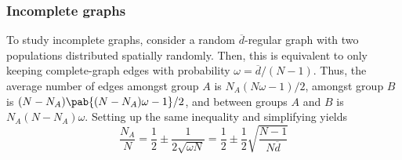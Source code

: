 \subsubsection{Incomplete graphs}\label{sec:two_unequal_groups_incomplete}
To study incomplete graphs,
consider a random $\overline{d}$-regular graph
with two populations distributed spatially randomly.
Then, this is equivalent to only keeping complete-graph edges
with probability $\omega = \overline{d}/(N-1)$.
Thus, the average number of edges
amongst group $A$ is $N_A (N \omega - 1)/2$,
amongst group $B$ is $(N-N_A)\pab{(N-N_A)\omega - 1}/2$,
and between groups $A$ and $B$ is $N_A (N-N_A) \omega$.
Setting up the same inequality and simplifying yields
\begin{equation*}
  \frac{N_A}{N} = \frac{1}{2} \pm \frac{1}{2 \sqrt{\omega N}}
  = \frac{1}{2} \pm \frac{1}{2} \sqrt{\frac{N-1}{N \overline{d}}}
\end{equation*}
